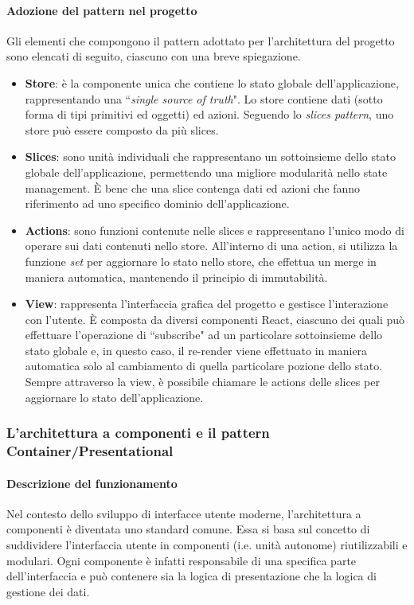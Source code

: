 \paragraph{Adozione del pattern nel progetto}
Gli elementi che compongono il pattern adottato per l'architettura del progetto sono elencati di seguito, ciascuno con una breve spiegazione.
\begin{itemize}
    \item \textbf{Store}: è la componente unica che contiene lo stato globale dell'applicazione, rappresentando una ``\textit{single source of truth}". Lo store contiene dati (sotto forma di tipi primitivi ed oggetti) ed azioni. Seguendo lo \textit{slices pattern}, uno store può essere composto da più slices.
    \item \textbf{Slices}: sono unità individuali che rappresentano un sottoinsieme dello stato globale dell'applicazione, permettendo una migliore modularità nello state management. È bene che una slice contenga dati ed azioni che fanno riferimento ad uno specifico dominio dell'applicazione.
    \item \textbf{Actions}: sono funzioni contenute nelle slices e rappresentano l'unico modo di operare sui dati contenuti nello store. All'interno di una action, si utilizza la funzione \textit{set} per aggiornare lo stato nello store, che effettua un merge in maniera automatica, mantenendo il principio di immutabilità.
    \item \textbf{View}: rappresenta l'interfaccia grafica del progetto e gestisce l'interazione con l'utente. È composta da diversi componenti React, ciascuno dei quali può effettuare l'operazione di ``subscribe" ad un particolare sottoinsieme dello stato globale e, in questo caso, il re-render viene effettuato in maniera automatica solo al cambiamento di quella particolare pozione dello stato. Sempre attraverso la view, è possibile chiamare le actions delle slices per aggiornare lo stato dell'applicazione.
\end{itemize}

\subsubsection{L'architettura a componenti e il pattern Container/Presentational}
\paragraph{Descrizione del funzionamento}
Nel contesto dello sviluppo di interfacce utente moderne, l'architettura a componenti è diventata uno standard comune. Essa si basa sul concetto di suddividere l'interfaccia utente in componenti (i.e. unità autonome) riutilizzabili e modulari. Ogni componente è infatti responsabile di una specifica parte dell'interfaccia e può contenere sia la logica di presentazione che la logica di gestione dei dati.

